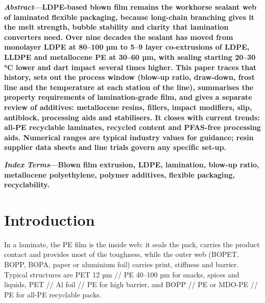 \documentclass[10pt,twocolumn,a4paper]{article}
\begin{document}

\noindent\textbf{\textit{Abstract}---LDPE-based blown film remains the workhorse sealant web of laminated flexible packaging, because long-chain branching gives it the melt strength, bubble stability and clarity that lamination converters need. Over nine decades the sealant has moved from monolayer LDPE at 80–100 µm to 5–9 layer co-extrusions of LDPE, LLDPE and metallocene PE at 30–60 µm, with sealing starting 20–30 °C lower and dart impact several times higher. This paper traces that history, sets out the process window (blow-up ratio, draw-down, frost line and the temperature at each station of the line), summarises the property requirements of lamination-grade film, and gives a separate review of additives: metallocene resins, fillers, impact modifiers, slip, antiblock, processing aids and stabilisers. It closes with current trends: all-PE recyclable laminates, recycled content and PFAS-free processing aids. Numerical ranges are typical industry values for guidance; resin supplier data sheets and line trials govern any specific set-up.}

\vspace{6pt}
\noindent\textbf{\textit{Index Terms}---Blown film extrusion, LDPE, lamination, blow-up ratio, metallocene polyethylene, polymer additives, flexible packaging, recyclability.}

\section{Introduction}

In a laminate, the PE film is the inside web: it seals the pack, carries the product contact and provides most of the toughness, while the outer web (BOPET, BOPP, BOPA, paper or aluminium foil) carries print, stiffness and barrier. Typical structures are PET 12 µm // PE 40–100 µm for snacks, spices and liquids, PET // Al foil // PE for high barrier, and BOPP // PE or MDO-PE // PE for all-PE recyclable packs.
\end{document}
